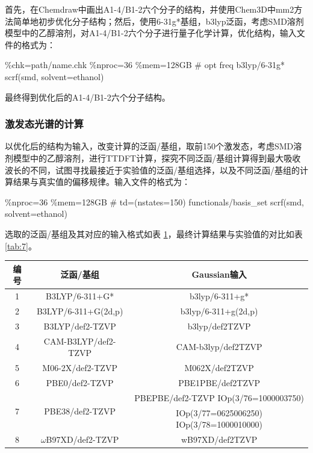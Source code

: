 首先，在Chemdraw中画出A1-4/B1-2六个分子的结构，并使用Chem3D中mm2方法简单地初步优化分子结构；然后，使用6-31g*基组，b3lyp泛函，考虑SMD溶剂模型中的乙醇溶剂，对A1-4/B1-2六个分子进行量子化学计算，优化结构，输入文件的格式为：
\begin{code}
 \%chk=path/name.chk
 \%nproc=36
 \%mem=128GB
 # opt freq b3lyp/6-31g* scrf(smd, solvent=ethanol)
\end{code}
最终得到优化后的A1-4/B1-2六个分子结构。

\subsubsection{激发态光谱的计算}

以优化后的结构为输入，改变计算的泛函/基组，取前150个激发态，考虑SMD溶剂模型中的乙醇溶剂，进行TTDFT计算，探究不同泛函/基组计算得到最大吸收波长的不同，试图寻找最接近于实验值的泛函/基组选择，以及不同泛函/基组的计算结果与真实值的偏移规律。输入文件的格式为：
\begin{code}
 \%nproc=36
 \%mem=128GB
 # td=(nstates=150) functionals/basis_set scrf(smd, solvent=ethanol)
\end{code}

选取的泛函/基组及其对应的输入格式如表 \ref{tab:6}，最终计算结果与实验值的对比如表 \ref{tab:7}。

\begin{table}[H]
    \centering
    \begin{tabular}{ccc}
    \toprule
    编号 & 泛函/基组 & Gaussian输入 \\
    \midrule
        1 & B3LYP/6-311+G* & b3lyp/6-311+g* \\
        2 & B3LYP/6-311+G(2d,p) & b3lyp/6-311+g(2d,p) \\
        3 & B3LYP/def2-TZVP & b3lyp/def2TZVP \\
        4 & CAM-B3LYP/def2-TZVP & CAM-b3lyp/def2TZVP \\
        5 & M06-2X/def2-TZVP & M062X/def2TZVP \\
        6 & PBE0/def2-TZVP & PBE1PBE/def2TZVP \\
        \multirow{2}{*}{7} & \multirow{2}{*}{PBE38/def2-TZVP} & PBEPBE/def2-TZVP IOp(3/76=1000003750)\\
        & & IOp(3/77=0625006250) IOp(3/78=1000010000) \\
        8 & $\omega$B97XD/def2-TZVP & wB97XD/def2TZVP \\
    \bottomrule
    \end{tabular}
    \label{tab:6}
\end{table}

